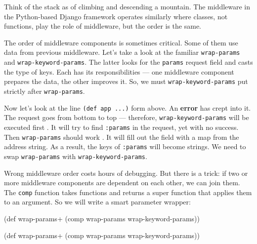 
Think of the stack as of climbing and descending a mountain. The middleware in the Python-based Django framework operates similarly where classes, not functions, play the role of middleware, but the order is the same.

The order of middleware components is sometimes critical. Some of them use data from previous middleware. Let's take a look at the familiar \verb|wrap-params| and
\verb|wrap-keyword-params|. The latter looks for the \verb|params| request field and casts the type of keys. Each has its responsibilities — one middleware component prepares the data, the other improves it. So, we must \verb|wrap-keyword-params| put strictly after \verb|wrap-params|.



Now let's look at the line \verb|(def app ...)| form above. An \textbf{error} has crept into it. The request goes from bottom to top — therefore, \verb|wrap-keyword-params| will be executed first . It will try to find \verb|:params| in the request, yet with no success. Then \verb|wrap-params| should work . It will fill out the field with a map from the address string. As a result, the keys of \verb|:params| will become strings. We need to swap \verb|wrap-params| with \verb|wrap-keyword-params|.

Wrong middleware order costs hours of debugging. But there is a trick: if two or more middleware components are dependent on each other, we can join them. The \verb|comp| function takes functions and returns a super function that applies them to an argument. So we will write a smart parameter wrapper:


\ifx\DEVICETYPE\MOBILE

\begin{english}
  \begin{clojure}
(def wrap-params+
  (comp wrap-params wrap-keyword-params))
  \end{clojure}
\end{english}

\else

\begin{english}
  \begin{clojure}
(def wrap-params+ (comp wrap-params wrap-keyword-params))
  \end{clojure}
\end{english}


